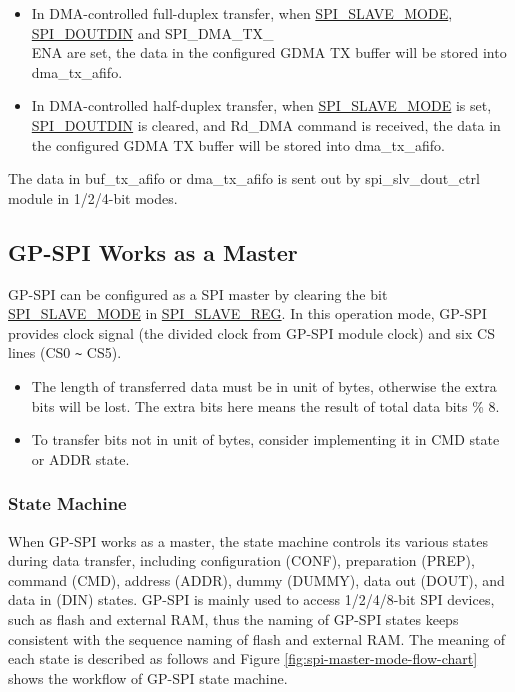 \documentclass[main\_\_EN.tex]{subfiles}
\begin{document}
\begin{itemize}
\begin{itemize}
        \item In DMA-controlled full-duplex transfer, when \hyperref[fielddesc:SPISLAVEMODE]{SPI\_SLAVE\_MODE}, \hyperref[fielddesc:SPIDOUTDIN]{SPI\_DOUTDIN} and SPI\_DMA\_TX\_\\ENA are set, the data in the configured GDMA TX buffer will be stored into dma\_tx\_afifo.

        \item In DMA-controlled half-duplex transfer, when \hyperref[fielddesc:SPISLAVEMODE]{SPI\_SLAVE\_MODE} is set, \hyperref[fielddesc:SPIDOUTDIN]{SPI\_DOUTDIN} is cleared, and Rd\_DMA command is received, the data in the configured GDMA TX buffer will be stored into dma\_tx\_afifo.

    \end{itemize}

The data in buf\_tx\_afifo or dma\_tx\_afifo is sent out by spi\_slv\_dout\_ctrl module in 1/2/4-bit modes.
\end{itemize}
\subsection{GP-SPI Works as a Master}\label{sec:gp-spi2-master-mode}

GP-SPI can be configured as a SPI master by clearing the bit \hyperref[fielddesc:SPISLAVEMODE]{SPI\_SLAVE\_MODE} in \hyperref[regdesc:SPISLAVEREG]{SPI\_SLAVE\_REG}. In this operation mode, GP-SPI provides clock signal (the divided clock from GP-SPI module clock) and six CS lines (CS0 \verb+~+ CS5).

\begin{tiplisting}
\vspace{-2em}
\begin{itemize}
    \item The length of transferred data must be in unit of bytes, otherwise the extra bits will be lost. The extra bits here means the result of total data bits \% 8.
    \item To transfer bits not in unit of bytes, consider implementing it in CMD state or ADDR state.
\end{itemize}
\end{tiplisting}

\subsubsection{State Machine}
\label{sec:gp-spi2-state-machine}

When GP-SPI works as a master, the state machine controls its various states during data transfer, including configuration (CONF), preparation (PREP), command (CMD), address (ADDR), dummy (DUMMY), data out (DOUT), and data in (DIN) states. GP-SPI is mainly used to access 1/2/4/8-bit SPI devices, such as flash and external RAM, thus the naming of GP-SPI states keeps consistent with the sequence naming of flash and external RAM. The meaning of each state is described as follows and Figure \ref{fig:spi-master-mode-flow-chart} shows the workflow of GP-SPI state machine.
\end{document}
